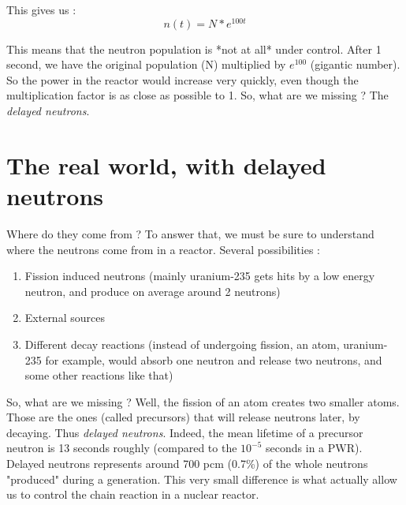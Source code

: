 This gives us :
\begin{equation}\label{eq8}
n(t) = N*e^{100t}
\end{equation}

This means that the neutron population is *not at all* under control. After 1 second, we have the original population (N) multiplied by $e^{100}$ (gigantic number). So the power in the reactor would increase very  quickly, even though the multiplication factor is as close as possible  to 1.
So, what are we missing ? The \emph{delayed neutrons}.

\section{The real world, with delayed neutrons}
Where do they come from ? To answer that, we must be sure to understand where the neutrons come from in a reactor. Several possibilities :

\begin{enumerate}
\item Fission induced neutrons (mainly uranium-235 gets hits by a low energy neutron, and produce on average around 2 neutrons)

\item External sources

\item Different decay reactions (instead of undergoing fission, an atom, uranium-235 for example, would absorb one neutron and release two neutrons, and some other reactions like that)
\end{enumerate}

So, what are we missing ? Well, the fission of an atom creates two smaller atoms. Those are the ones (called precursors) that will release neutrons later, by decaying. Thus \emph{delayed neutrons}. Indeed, the mean lifetime of a precursor neutron is 13 seconds roughly (compared to the $10^{-5}$ seconds in a PWR).
Delayed neutrons represents around 700 pcm (0.7\%) of the whole neutrons "produced" during a generation. This very small difference is what actually allow us to control the chain reaction in a nuclear reactor.





\
